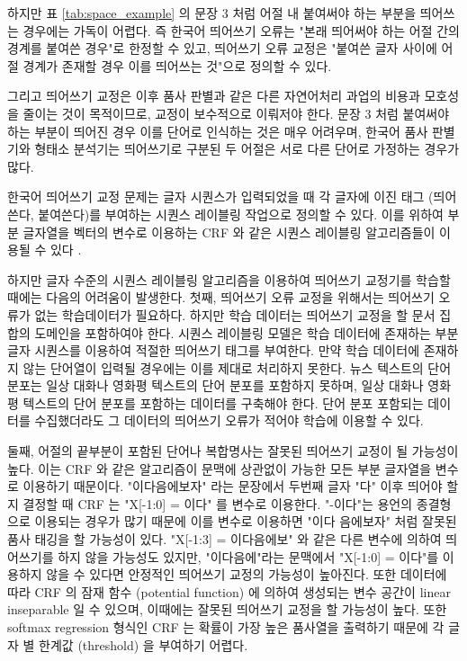 \documentclass[11pt]{article}
\begin{document}
하지만 표 \ref{tab:space_example} 의 문장 3 처럼 어절 내 붙여써야 하는 부분을 띄어쓰는 경우에는 가독이 어렵다.
즉 한국어 띄어쓰기 오류는 "본래 띄어써야 하는 어절 간의 경계를 붙여쓴 경우"로 한정할 수 있고, 띄어쓰기 오류 교정은 "붙여쓴 글자 사이에 어절 경계가 존재할 경우 이를 띄어쓰는 것"으로 정의할 수 있다.

그리고 띄어쓰기 교정은 이후 품사 판별과 같은 다른 자연어처리 과업의 비용과 모호성을 줄이는 것이 목적이므로, 교정이 보수적으로 이뤄저야 한다.
문장 3 처럼 붙여써야 하는 부분이 띄어진 경우 이를 단어로 인식하는 것은 매우 어려우며, 한국어 품사 판별기와 형태소 분석기는 띄어쓰기로 구분된 두 어절은 서로 다른 단어로 가정하는 경우가 많다.

한국어 띄어쓰기 교정 문제는 글자 시퀀스가 입력되었을 때 각 글자에 이진 태그 (띄어쓴다, 붙여쓴다)를 부여하는 시퀀스 레이블링 작업으로 정의할 수 있다.
이를 위하여 부분 글자열을 벡터의 변수로 이용하는 CRF 와 같은 시퀀스 레이블링 알고리즘들이 이용될 수 있다 \citep{lee2002automatic, lee2007automatic, shim2011crf, lee2013automatic, lee2013joint, Lee2017adatadriven, hong2007korean, kang2006category}.

하지만 글자 수준의 시퀀스 레이블링 알고리즘을 이용하여 띄어쓰기 교정기를 학습할 때에는 다음의 어려움이 발생한다.
첫째, 띄어쓰기 오류 교정을 위해서는 띄어쓰기 오류가 없는 학습데이터가 필요하다.
하지만 학습 데이터는 띄어쓰기 교정을 할 문서 집합의 도메인을 포함하여야 한다.
시퀀스 레이블링 모델은 학습 데이터에 존재하는 부분 글자 시퀀스를 이용하여 적절한 띄어쓰기 태그를 부여한다.
만약 학습 데이터에 존재하지 않는 단어열이 입력될 경우에는 이를 제대로 처리하지 못한다.
뉴스 텍스트의 단어 분포는 일상 대화나 영화평 텍스트의 단어 분포를 포함하지 못하며, 일상 대화나 영화평 텍스트의 단어 분포를 포함하는 데이터를 구축해야 한다.
단어 분포 포함되는 데이터를 수집했더라도 그 데이터의 띄어쓰기 오류가 적어야 학습에 이용할 수 있다.

둘째, 어절의 끝부분이 포함된 단어나 복합명사는 잘못된 띄어쓰기 교정이 될 가능성이 높다.
이는 CRF 와 같은 알고리즘이 문맥에 상관없이 가능한 모든 부분 글자열을 변수로 이용하기 때문이다.
"이다음에보자" 라는 문장에서 두번째 글자 "다" 이후 띄어야 할지 결정할 때 CRF 는 "X[-1:0] = 이다" 를 변수로 이용한다.
"-이다"는 용언의 종결형으로 이용되는 경우가 많기 때문에 이를 변수로 이용하면 "이다 음에보자" 처럼 잘못된 품사 태깅을 할 가능성이 있다.
"X[-1:3] = 이다음에보" 와 같은 다른 변수에 의하여 띄어쓰기를 하지 않을 가능성도 있지만, "이다음에"라는 문맥에서 "X[-1:0] = 이다"를 이용하지 않을 수 있다면 안정적인 띄어쓰기 교정의 가능성이 높아진다.
또한 데이터에 따라 CRF 의 잠재 함수 (potential function) 에 의하여 생성되는 변수 공간이 linear inseparable 일 수 있으며, 이때에는 잘못된 띄어쓰기 교정을 할 가능성이 높다.
또한 softmax regression 형식인 CRF 는 확률이 가장 높은 품사열을 출력하기 때문에 각 글자 별 한계값 (threshold) 을 부여하기 어렵다.
\end{document}
